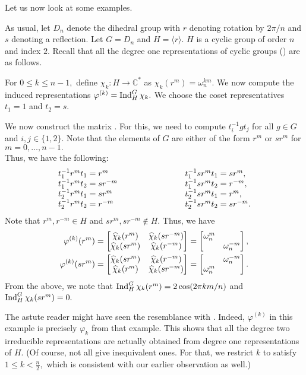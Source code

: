 Let us now look at some examples.
\begin{ex} \label{ex:inductdihedral}
	As usual, let $D_n$ denote the dihedral group with $r$ denoting rotation by $2\pi/n$ and $s$ denoting a reflection. Let $G = D_n$ and $H = \langle r\rangle.$ $H$ is a cyclic group of order $n$ and index $2.$ Recall that all the degree one representations of cyclic groups () are as follows.

	For $0 \le k \le n - 1,$ define $\chi_k : H \to \mathbb{C}^*$ as $\chi_k(r^m) = \omega_n^{km}.$ We now compute the induced representations $\varphi^{(k)} = \operatorname{Ind}^{G}_{H}\chi_k.$ We choose the coset representatives $t_1 = 1$ and $t_2 = s.$

	We now construct the matrix . For this, we need to compute $t_i^{-1}gt_j$ for all $g \in G$ and $i, j \in \{1, 2\}.$ Note that the elements of $G$ are either of the form $r^m$ or $sr^m$ for $m = 0, \ldots, n- 1.$ \\
	Thus, we have the following:
	\begin{align*} 
		\begin{array}{lll}
			t_1^{-1}r^mt_1 = r^m & \phantom{hi}\hspace{1.5cm}\phantom{hi} & t_1^{-1}sr^mt_1 = sr^m,\\
			t_1^{-1}r^mt_2 = sr^{-m} & & t_1^{-1}sr^mt_2 = r^{-m},\\
			t_2^{-1}r^mt_1 = sr^m & & t_2^{-1}sr^mt_1 = r^m,\\
			t_2^{-1}r^mt_2 = r^{-m} & & t_2^{-1}sr^mt_2 = sr^{-m}.
		\end{array}
	\end{align*}
	Note that $r^m, r^{-m} \in H$ and $sr^m, sr^{-m} \notin H.$ Thus, we have
	\begin{align*} 
		\varphi^{(k)}(r^m) &= \begin{bmatrix} \widehat{\chi}_k(r^m) & \widehat{\chi}_k(sr^{-m}) \\ \widehat{\chi}_k(sr^{m}) & \widehat{\chi}_k(r^{-m}) \end{bmatrix} = \begin{bmatrix} \omega_n^m &  \\  & \omega_n^{-m} \end{bmatrix},\\
		\varphi^{(k)}(sr^m) &= \begin{bmatrix} \widehat{\chi}_k(sr^m) & \widehat{\chi}_k(r^{-m}) \\ \widehat{\chi}_k(r^{m}) & \widehat{\chi}_k(sr^{-m}) \end{bmatrix} = \begin{bmatrix}  & \omega_n^{-m} \\ \omega_n^m &  \end{bmatrix}.
	\end{align*}
	From the above, we note that $\operatorname{Ind}^{G}_{H}\chi_k(r^m) = 2\cos(2\pi km/n)$ and $\operatorname{Ind}^{G}_{H}\chi_k(sr^m) = 0.$

	The astute reader might have seen the resemblance with . Indeed, $\varphi^{(k)}$ in this example is precisely $\varphi_k$ from that example. This shows that all the degree two irreducible representations are actually obtained from degree one representations of $H.$ (Of course, not all give inequivalent ones. For that, we restrict $k$ to satisfy $1 \le k < \frac{n}{2},$ which is consistent with our earlier observation as well.)
\end{ex}

